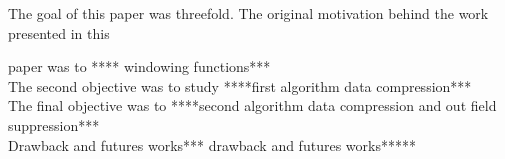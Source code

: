 \documentclass[useAMS,usenatbib]{mn2e}
\begin{document}
The goal of this paper was threefold. The original motivation behind the work presented in this

paper was to **** windowing functions***\\
The second objective  was to study ****first algorithm data compression***\\
The final objective was to ****second algorithm data compression and out field suppression*** \\
Drawback and futures works*** drawback and futures works*****
\end{document}
